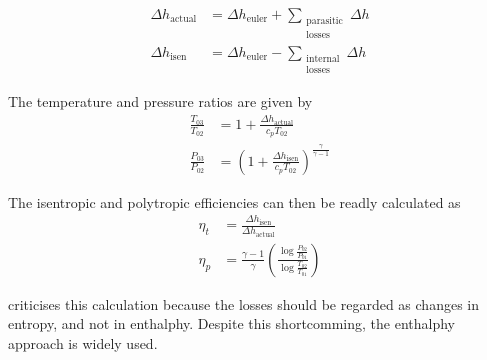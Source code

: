 \documentclass[tcc]{subfiles}
\begin{document}
\begin{align}
    \Delta h_{\text{actual}} &= \Delta h_{\text{euler}} + \sum_{\substack{
                                                            \text{parasitic} \\ 
                                                            \text{losses}
                                                        }}
                                                          \Delta h \\
    \Delta h_{\text{isen}}  &= \Delta h_{\text{euler}} - \sum_{\substack{
                                                            \text{internal} \\ 
                                                            \text{losses}
                                                        }}
                                                          \Delta h
\end{align}

The temperature and pressure ratios are given by
\begin{align}
    \frac{T_{03}}{T_{02}} &= 1 + \frac{\Delta h_{\text{actual}}}{c_p T_{02}} \\
    \frac{P_{03}}{P_{02}} &= \left( 1 + \frac{\Delta h_{\text{isen}}}{c_p T_{02}}\right)^{\frac{\gamma}{\gamma-1}}
\end{align}

The isentropic and polytropic efficiencies can then be readly calculated as
\begin{align}
    \eta_t &= \frac{\Delta h_{\text{isen}}}{\Delta h_{\text{actual}}}\\
    \eta_p &= \frac{\gamma-1}{\gamma} \left(\frac{\log\frac{P_{02}}{P_{01}}}
                                                 {\log\frac{T_{02}}{T_{01}}}
                                     \right)
\end{align}

\textcite{Aungier1995} criticises this calculation because the losses should be regarded as changes in entropy, and not in enthalphy. Despite this shortcomming, the enthalphy approach is widely used.
\end{document}
